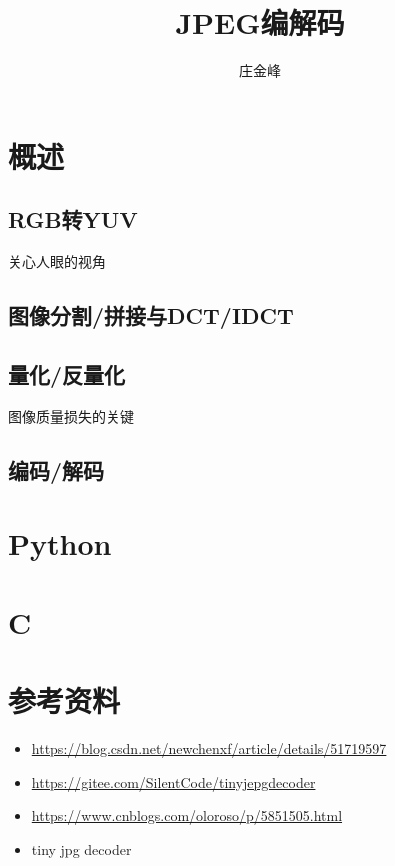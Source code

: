 \documentclass{article}
\title{JPEG编解码}
\author{庄金峰}
\begin{document}
\maketitle

\section{概述}

\subsection{RGB转YUV}

关心人眼的视角

\subsection{图像分割/拼接与DCT/IDCT}

\subsection{量化/反量化}

图像质量损失的关键

\subsection{编码/解码}

\section{Python}

\section{C}

\section{参考资料}

\begin{itemize}
\item \url{https://blog.csdn.net/newchenxf/article/details/51719597}
\item \url{https://gitee.com/SilentCode/tinyjepgdecoder}
\item \url{https://www.cnblogs.com/oloroso/p/5851505.html}
\item tiny jpg decoder
\end{itemize}
\end{document}
